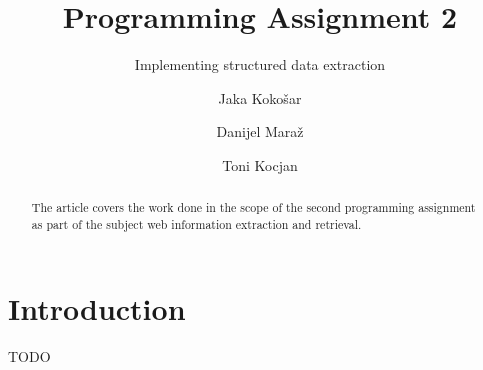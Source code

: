 \documentclass[runningheads]{llncs}
\begin{document}
\title{Programming Assignment 2}
\subtitle{Implementing structured data extraction}

\author{
  Jaka Kokošar
  \and
  Danijel Maraž
  \and
  Toni Kocjan
}



\maketitle             

\begin{abstract}
The article covers the work done in the scope of the second programming assignment as part of the subject web information extraction and retrieval. 

\end{abstract}

\section{Introduction}
TODO



 
 
\end{document}
